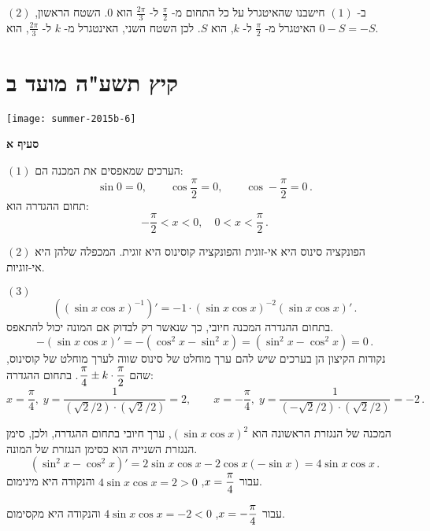 \vspace{-4ex}

$(2)$
ב-%
$(1)$
חישבנו שהאיטגרל על כל התחום מ-%
$\frac{\pi}{2}$
ל-%
$\frac{2\pi}{3}$
הוא 
$0$.
השטח הראשון, האיטגרל מ-%
$\frac{\pi}{2}$
ל-%
$k$,
הוא
$S$.
לכן השטח השני, האינטגרל מ-%
$k$
ל-%
$\frac{2\pi}{3}$,
הוא
$0-S=-S$.

\np


\section{קיץ תשע"ה מועד ב}

\begin{center}
\texttt{[image: summer-2015b-6]}
\end{center}

\textbf{סעיף א}

$(1)$
הערכים שמאפסים את המכנה הם:
\[
\sin 0=0,\quad\quad \cos \frac{\pi}{2}= 0,\quad\quad \cos -\frac{\pi}{2}=0\,.
\]
תחום ההגדרה הוא:
\[
-\frac{\pi}{2} < x < 0,\quad 0 < x < \frac{\pi}{2}\,.
\]

$(2)$
הפונקציה סינוס היא אי-זוגית והפונקציה קוסינוס היא זוגית. המכפלה שלהן היא אי-זוגיות.

$(3)$
\[
((\sin x \cos x)^{-1})'= -1\cdot (\sin x \cos x)^{-2}(\sin x\cos x)'\,.
\]
בתחום ההגדרה המכנה חיובי, כך שנאשר רק לבדוק אם המונה יכול להתאפס.
\[
-(\sin x\cos x)'=-(\cos^2 x-\sin^2 x)=(\sin^2 x-\cos^2 x)=0\,.
\]
נקודות הקיצון הן בערכים שיש להם ערך מוחלט של סינוס שווה לערך מוחלט של קוסינוס, שהם
$\displaystyle\frac{\pi}{4}\pm k\cdot\displaystyle\frac{\pi}{2}$.
בתחום ההגדרה:
\[
x=\frac{\pi}{4},\; y=\frac{1}{(\sqrt{2}/2)\cdot(\sqrt{2}/2)}= 2,\quad\quad x=-\frac{\pi}{4},\; y=\frac{1}{(-\sqrt{2}/2)\cdot(\sqrt{2}/2)}= -2\,.
\]

\np

המכנה של הנגזרת הראשונה הוא 
$(\sin x \cos x)^2$,
ערך חיובי בתחום ההגדרה, ולכן, סימן הנגזרת השנייה הוא כסימן הנגזרת של המונה.
\[
(\sin^2 x-\cos^2 x)'=2\sin x \cos x -2 \cos x (-\sin x)=4\sin x\cos x\,.
\]
עבור
$x=\displaystyle\frac{\pi}{4}$,
$4\sin x\cos x=2>0$
והנקודה היא מינימום.

עבור
$x=-\displaystyle\frac{\pi}{4}$,
$4\sin x\cos x=-2<0$
והנקודה היא מקסימום.

